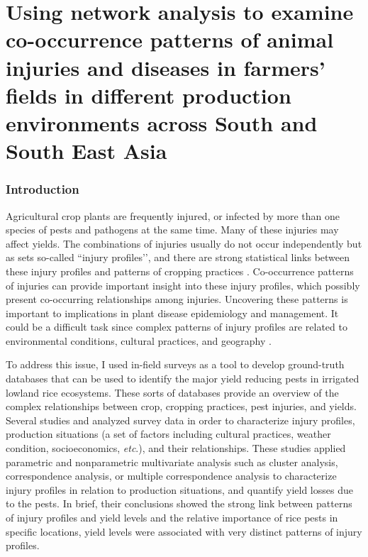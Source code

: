 \chapter{Using network analysis to examine co-occurrence patterns of animal injuries and diseases in farmers' fields in different production environments across South and South East Asia}

\subsection{Introduction}

Agricultural crop plants are frequently injured, or infected by more than one species of pests and pathogens at the same time. Many of these injuries may affect yields. The combinations of injuries usually do not occur independently but as sets so-called ``injury profiles’’, and there are strong statistical links between these injury profiles and patterns of cropping practices \citep{Savary_2006_Quantification}. Co-occurrence patterns of injuries can provide important insight into these injury profiles, which possibly present co-occurring relationships among injuries. Uncovering these patterns is important to implications in plant disease epidemiology and management. It could be a difficult task since complex patterns of injury profiles are related to environmental conditions, cultural practices, and geography \citep{Willocquet_2008_Simulating}. 

To address this issue, I used in-field surveys as a tool to develop ground-truth databases that can be used to identify the major yield reducing pests in irrigated lowland rice ecosystems. These sorts of databases provide an overview of the complex relationships between crop, cropping practices, pest injuries, and yields. Several studies \citet{Savary_2000_Quantification, Savary_2000_Characterization, Dong_2010_Characterization} and \citet{Reddy_2011_Characterizing} analyzed survey data in order to characterize injury profiles, production situations (a set of factors including cultural practices, weather condition, socioeconomics, \textit{etc}.), and their relationships. These studies applied parametric and nonparametric multivariate analysis such as cluster analysis, correspondence analysis, or multiple correspondence analysis to characterize injury profiles in relation to production situations, and quantify yield losses due to the pests. In brief, their conclusions showed the strong link between patterns of injury profiles and yield levels and the relative importance of rice pests in specific locations, yield levels were associated with very distinct patterns of injury profiles.

